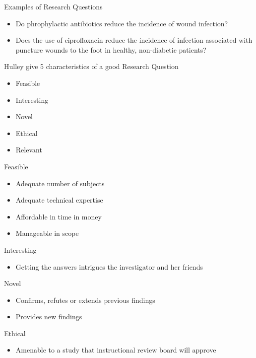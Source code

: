 \documentclass[14pt]{beamer}
\begin{document}
\begin{frame}{Examples of Research Questions}
\begin{itemize}
\item Do phrophylactic antibiotics reduce the incidence of wound infection?
\item Does the use of ciprofloxacin reduce the incidence of infection 
  associated with puncture wounds to the foot in healthy, non-diabetic patients?
\end{itemize}
\end{frame}

\begin{frame}{Hulley \cite{Hulley2001} give 5 characteristics of a good
Research Question}
\begin{itemize}
\item Feasible
\item Interesting
\item Novel
\item Ethical
\item Relevant
\end{itemize}
\end{frame}

\begin{frame}{Feasible}
\begin{itemize}
\item Adequate number of subjects
\item Adequate technical expertise
\item Affordable in time in money
\item Manageable in scope
\end{itemize}
\end{frame}

\begin{frame}{Interesting}
\begin{itemize}
\item Getting the answers intrigues the investigator and her friends
\end{itemize}
\end{frame}

\begin{frame}{Novel}
\begin{itemize}
\item Confirms, refutes or extends previous findings
\item Provides new findings
\end{itemize}
\end{frame}

\begin{frame}{Ethical}
\begin{itemize}
\item Amenable to a study that instructional review board will approve
\end{itemize}
\end{frame}
\end{document}
